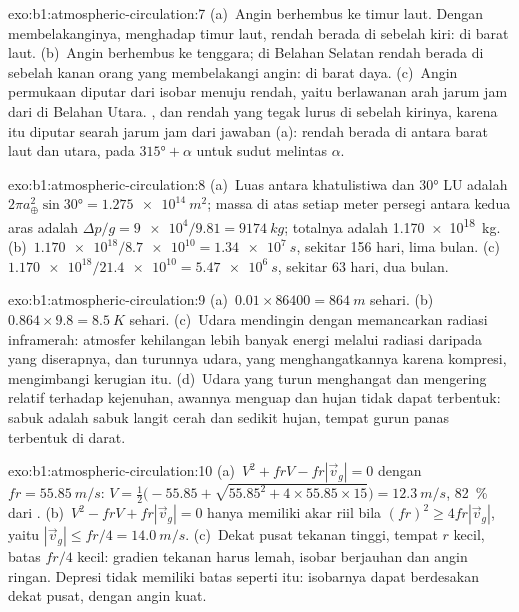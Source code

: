 \begin{solution}{exo:b1:atmospheric-circulation:7}
(a)~Angin berhembus ke timur laut. Dengan membelakanginya, menghadap timur laut,
rendah berada di sebelah kiri: di barat laut. (b)~Angin berhembus ke
tenggara; di Belahan Selatan rendah berada di sebelah kanan orang yang membelakangi angin: di barat daya.
(c)~Angin permukaan diputar dari isobar menuju rendah, yaitu berlawanan arah jarum jam dari  di Belahan Utara.
, dan rendah yang tegak lurus di sebelah kirinya, karena itu diputar searah jarum jam dari jawaban (a): rendah
berada di antara barat laut dan utara, pada  $\ang{315} + \alpha$ untuk sudut melintas $\alpha$.
\end{solution}

\begin{solution}{exo:b1:atmospheric-circulation:8}
(a)~Luas antara khatulistiwa dan \ang{30} LU adalah $2\pi a_\oplus^2\sin\ang{30} =
\qty{1.275e14}{m^2}$; massa di atas setiap meter persegi antara kedua aras adalah
$\Delta p/g = \num{9e4}/9.81 = \qty{9174}{kg}$; totalnya adalah
\qty{1.170e18}{kg}. (b)~$\num{1.170e18}/\num{8.7e10} = \qty{1.34e7}{s}$, sekitar
\num{156} hari, lima bulan. (c)~$\num{1.170e18}/\num{21.4e10} = \qty{5.47e6}{s}$,
sekitar \num{63} hari, dua bulan.
\end{solution}

\begin{solution}{exo:b1:atmospheric-circulation:9}
(a)~$\num{0.01} \times \num{86400} = \qty{864}{m}$ sehari. (b)~$0.864 \times 9.8 =
\qty{8.5}{K}$ sehari. (c)~Udara mendingin dengan memancarkan radiasi inframerah: atmosfer
kehilangan lebih banyak energi melalui radiasi daripada yang diserapnya, dan turunnya udara, yang menghangatkannya karena kompresi, mengimbangi kerugian itu. (d)~Udara yang turun menghangat dan mengering
relatif terhadap kejenuhan, awannya menguap dan hujan tidak dapat terbentuk: sabuk  adalah sabuk langit cerah dan sedikit hujan, tempat gurun panas terbentuk di darat.
\end{solution}

\begin{solution}{exo:b1:atmospheric-circulation:10}
(a)~$V^2 + frV - fr|\vec v_g| = 0$ dengan $fr = \qty{55.85}{m/s}$:
$V = \tfrac12\bigl(-55.85 + \sqrt{55.85^2 + 4 \times 55.85 \times 15}\bigr) =
\qty{12.3}{m/s}$, \qty{82}{\percent} dari . (b)~$V^2 - frV +
fr|\vec v_g| = 0$ hanya memiliki akar riil bila $(fr)^2 \geq 4fr|\vec v_g|$, yaitu
$|\vec v_g| \leq fr/4 = \qty{14.0}{m/s}$. (c)~Dekat pusat tekanan tinggi, tempat $r$ kecil,
batas $fr/4$ kecil: gradien tekanan harus lemah, isobar berjauhan dan angin ringan. Depresi tidak memiliki batas seperti itu: isobarnya dapat berdesakan dekat pusat, dengan angin kuat.
\end{solution}

